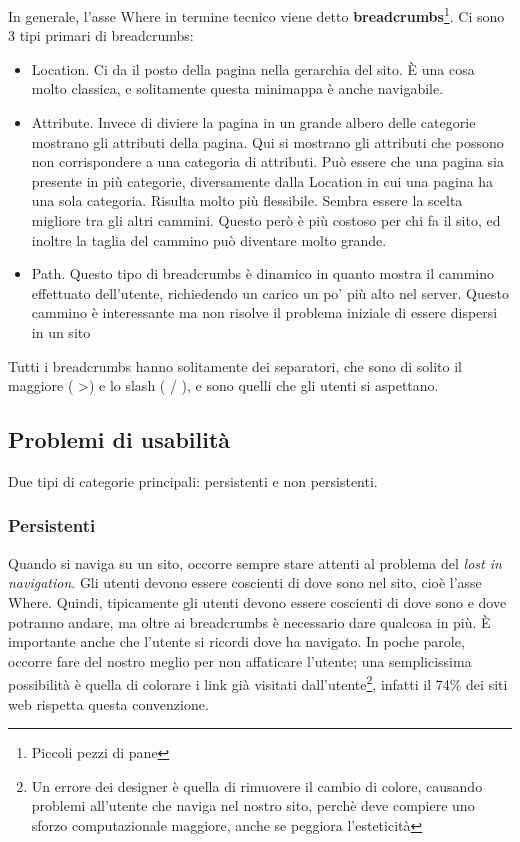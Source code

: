 In generale, l'asse Where in termine tecnico viene detto \textbf{breadcrumbs}\footnote{Piccoli pezzi di pane}. Ci sono 3 tipi primari di breadcrumbs:
\begin{itemize}

\item Location. Ci da il posto della pagina nella gerarchia del sito. \`E una cosa molto classica, e solitamente questa minimappa \`e anche navigabile.

\item Attribute. Invece di diviere la pagina in un grande albero delle categorie mostrano gli attributi della pagina. Qui si mostrano gli attributi che possono non corrispondere a una categoria di attributi. Pu\`o essere che una pagina sia presente in pi\`u categorie, diversamente dalla Location in cui una pagina ha una sola categoria. Risulta molto pi\`u flessibile. Sembra essere la scelta migliore tra gli altri cammini. Questo per\`o \`e pi\`u costoso per chi fa il sito, ed inoltre la taglia del cammino pu\`o diventare molto grande.

\item Path. Questo tipo di breadcrumbs \`e dinamico in quanto mostra il cammino effettuato dell'utente, richiedendo un carico un po' pi\`u alto nel server. Questo cammino \`e interessante ma non risolve il problema iniziale di essere dispersi in un sito

\end{itemize}

Tutti i breadcrumbs hanno solitamente dei separatori, che sono di solito il maggiore ( \textgreater ) e lo slash ( / ), e sono quelli che gli utenti si aspettano.

\subsection{Problemi di usabilit\`a}

Due tipi di categorie principali: persistenti e non persistenti.

\subsubsection{Persistenti}

Quando si naviga su un sito, occorre sempre stare attenti al problema del \textit{lost in navigation}. Gli utenti devono essere coscienti di dove sono nel sito, cio\`e l'asse Where. Quindi, tipicamente gli utenti devono essere coscienti di dove sono e dove potranno andare, ma oltre ai breadcrumbs \`e necessario dare qualcosa in pi\`u. \`E importante anche che l'utente si ricordi dove ha navigato. In poche parole, occorre fare del nostro meglio per non affaticare l'utente; una semplicissima possibilit\`a \`e quella di colorare i link gi\`a visitati dall'utente\footnote{Un errore dei designer \`e quella di rimuovere il cambio di colore, causando problemi all'utente che naviga nel nostro sito, perch\`e deve compiere uno sforzo computazionale maggiore, anche se peggiora l'esteticit\`a}, infatti il 74\% dei siti web rispetta questa convenzione.

